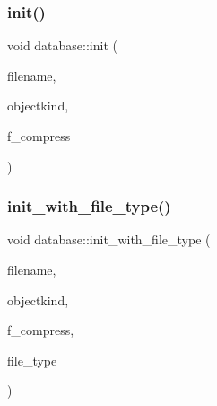 \mbox{\label{classdatabase_abae7da96fe55d9f7ca44473b06a1e113}} 
\subsubsection{\texorpdfstring{init()}{init()}}
{\footnotesize\ttfamily void database\+::init (\begin{DoxyParamCaption}\item[{const \mbox{\hyperlink{galois_8h_ab6cc7b4aeb6ea31aba2b3fbfc83ff5e6}{B\+Y\+TE}} $\ast$}]{filename,  }\item[{\mbox{\hyperlink{galois_8h_a09fddde158a3a20bd2dcadb609de11dc}{I\+NT}}}]{objectkind,  }\item[{\mbox{\hyperlink{galois_8h_a09fddde158a3a20bd2dcadb609de11dc}{I\+NT}}}]{f\+\_\+compress }\end{DoxyParamCaption})}

\mbox{\label{classdatabase_a3b7a27f69a64812a6bfd765158d62476}} 
\subsubsection{\texorpdfstring{init\+\_\+with\+\_\+file\+\_\+type()}{init\_with\_file\_type()}}
{\footnotesize\ttfamily void database\+::init\+\_\+with\+\_\+file\+\_\+type (\begin{DoxyParamCaption}\item[{const \mbox{\hyperlink{galois_8h_ab6cc7b4aeb6ea31aba2b3fbfc83ff5e6}{B\+Y\+TE}} $\ast$}]{filename,  }\item[{\mbox{\hyperlink{galois_8h_a09fddde158a3a20bd2dcadb609de11dc}{I\+NT}}}]{objectkind,  }\item[{\mbox{\hyperlink{galois_8h_a09fddde158a3a20bd2dcadb609de11dc}{I\+NT}}}]{f\+\_\+compress,  }\item[{\mbox{\hyperlink{galois_8h_a09fddde158a3a20bd2dcadb609de11dc}{I\+NT}}}]{file\+\_\+type }\end{DoxyParamCaption})}

\mbox{\label{classdatabase_af17af33b686cba55558237b04714108f}} 
